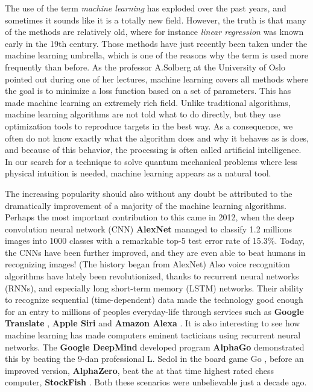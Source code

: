The use of the term \textit{machine learning} has exploded over the past years, and sometimes it sounds like it is a totally new field. However, the truth is that many of the methods are relatively old, where for instance \textit{linear regression} was known early in the 19th century. \cite{legendre_nouvelles_1805, gauss_theoria_1809} Those methods have just recently been taken under the machine learning umbrella, which is one of the reasons why the term is used more frequently than before. As the professor A.Solberg at the University of Oslo pointed out during one of her lectures, machine learning covers all methods where the goal is to minimize a loss function based on a set of parameters. This has made machine learning an extremely rich field. Unlike traditional algorithms, machine learning algorithms are not told what to do directly, but they use optimization tools to reproduce targets in the best way. As a consequence, we often do not know exactly what the algorithm does and why it behaves as is does, and because of this behavior, the processing is often called artificial intelligence. In our search for a technique to solve quantum mechanical problems where less physical intuition is needed, machine learning appears as a natural tool.

The increasing popularity should also without any doubt be attributed to the dramatically improvement of a majority of the machine learning algorithms. Perhaps the most important contribution to this came in 2012, when the deep convolution neural network (CNN) \textbf{AlexNet} managed to classify 1.2 millions images into 1000 classes with a remarkable top-5 test error rate of 15.3\%. \cite{krizhevsky_imagenet_2012} Today, the CNNs have been further improved, and they are even able to beat humans in recognizing images! (The history began from AlexNet) Also voice recognition algorithms have lately been revolutionized, thanks to recurrent neural networks (RNNs), and especially long short-term memory (LSTM) networks. Their ability to recognize sequential (time-dependent) data made the technology good enough for an entry to millions of peoples everyday-life through services such as \textbf{Google Translate} \cite{wu_googles_2016}, \textbf{Apple Siri} \cite{smith_ios_2016} and \textbf{Amazon Alexa} \cite{noauthor_bringing_nodate}. It is also interesting to see how machine learning has made computers eminent tacticians using recurrent neural networks. The \textbf{Google DeepMind} developed program \textbf{AlphaGo} demonstrated this by beating the 9-dan professional L. Sedol in the board game Go \cite{noauthor_alphago_nodate}, before an improved version, \textbf{AlphaZero}, beat the at that time highest rated chess computer, \textbf{StockFish} \cite{klein_mikeklein_googles_nodate}. Both these scenarios were unbelievable just a decade ago.

